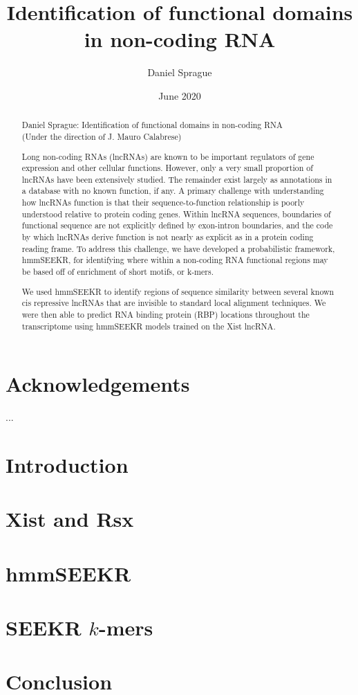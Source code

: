 \documentclass[12pt,left=1in,right=1in,top=1in,bottom=1in]{report}
\title{
    {Identification of functional domains \linebreak in non-coding RNA}\\
    }
\author{Daniel Sprague}
\date{June 2020}
\def\frontmatter{%
    \pagenumbering{roman}
    \setcounter{page}{1}
    \renewcommand{\thesection}{\Roman{section}}
}%
\def\mainmatter{%
    \pagenumbering{arabic}
    \setcounter{page}{1}
    \setcounter{section}{0}
    \renewcommand{\thesection}{\arabic{section}}
}%
\begin{document}
\frontmatter

\maketitle
\begin{abstract}
\begin{center}
Daniel Sprague: Identification of functional domains in non-coding RNA\\
(Under the direction of J. Mauro Calabrese)
\end{center}
Long non-coding RNAs (lncRNAs) are known to be important regulators of gene expression and other cellular functions. However, only a very small proportion of lncRNAs have been extensively studied. The remainder exist largely as annotations in a database with no known function, if any. A primary challenge with understanding how lncRNAs function is that their sequence-to-function relationship is poorly understood relative to protein coding genes. Within lncRNA sequences, boundaries of functional sequence are not explicitly defined by exon-intron boundaries, and the code by which lncRNAs derive function is not nearly as explicit as in a protein coding reading frame. To address this challenge, we have developed a probabilistic framework, hmmSEEKR, for identifying where within a non-coding RNA functional regions may be based off of enrichment of short motifs, or k-mers. 

We used hmmSEEKR to identify regions of sequence similarity between several known cis repressive lncRNAs that are invisible to standard local alignment techniques. We were then able to predict RNA binding protein (RBP) locations throughout the transcriptome using hmmSEEKR models trained on the Xist lncRNA.
\end{abstract}
\chapter*{\center Acknowledgements}
\begin{center}
...
\end{center}
\tableofcontents

\mainmatter

\chapter{Introduction}

\chapter{Xist and Rsx}

\chapter{hmmSEEKR}

\chapter{SEEKR $k$-mers}
\chapter{Conclusion}




\end{document}

